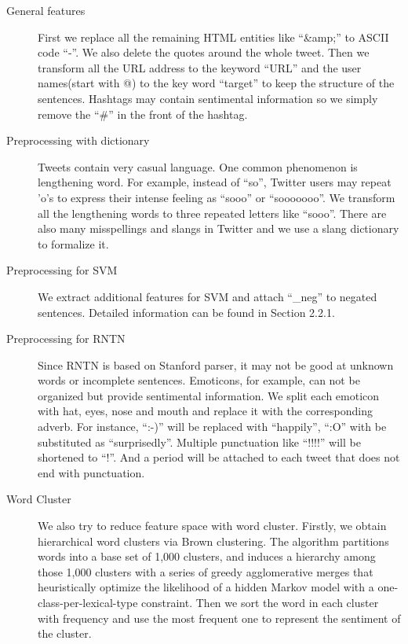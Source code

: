 \begin{description}
\item[General features] First we replace all the remaining HTML entities like ``\&amp;'' to ASCII code ``-''. We also delete the quotes around the whole tweet. Then we transform all the URL address to the keyword ``URL'' and the user names(start with @) to the key word ``target'' to keep the structure of the sentences. Hashtags may contain sentimental information so we simply remove the ``\#'' in the front of the hashtag.
\item[Preprocessing with dictionary] Tweets contain very casual language. One common phenomenon is lengthening word. For example, instead of ``so'', Twitter users may repeat 'o's to express their intense feeling as ``sooo'' or ``sooooooo''. We transform all the lengthening words to three repeated letters like ``sooo''. There are also many misspellings and slangs in Twitter and we use a slang dictionary to formalize it.
\item[Preprocessing for SVM] We extract additional features for SVM and attach ``\_neg'' to negated sentences. Detailed information can be found in Section 2.2.1.
\item[Preprocessing for RNTN] Since RNTN is based on Stanford parser, it may not be good at unknown words or incomplete sentences. Emoticons, for example, can not be organized but provide sentimental information. We split each emoticon with hat, eyes, nose and mouth and replace it with the corresponding adverb. For instance, ``:-)'' will be replaced with ``happily'', ``:O'' with be substituted as ``surprisedly''. Multiple punctuation like ``!!!!'' will be shortened to ``!''. And a period will be attached to each tweet that does not end with punctuation.
\item[Word Cluster] We also try to reduce feature space with word cluster. Firstly, we obtain hierarchical word clusters via Brown clustering. The algorithm partitions words into a base set of 1,000 clusters, and induces a hierarchy among those 1,000 clusters with a series of greedy agglomerative merges that heuristically optimize the likelihood of a hidden Markov model with a one-class-per-lexical-type constraint. Then we sort the word in each cluster with frequency and use the most frequent one to represent the sentiment of the cluster.

\end{description}



